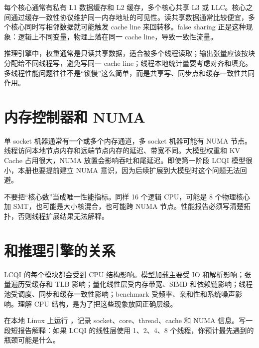 每个核心通常有私有 L1 数据缓存和 L2 缓存，多个核心共享 L3 或 LLC。核心之间通过缓存一致性协议维护同一内存地址的可见性。读共享数据通常比较便宜，多个核心同时写相邻数据就可能触发 cache line 来回转移。false sharing 正是这种现象：逻辑上不同变量，物理上落在同一 cache line，导致一致性流量。

推理引擎中，权重通常是只读共享数据，适合被多个线程读取；输出张量应该按块分配给不同线程写，避免写同一 cache line；线程本地统计量要考虑对齐和填充。多线程性能问题往往不是“锁慢”这么简单，而是共享写、同步点和缓存一致性共同作用。

\section{内存控制器和 NUMA}

单 socket 机器通常有一个或多个内存通道，多 socket 机器可能有 NUMA 节点。线程访问本地节点内存和远端节点内存的延迟、带宽不同。大模型权重和 KV Cache 占用很大，NUMA 放置会影响吞吐和尾延迟。即使第一阶段 LCQI 模型很小，本册也要提前建立 NUMA 意识，因为后续扩展到大模型时这个问题无法回避。

\begin{warningbox}
不要把“核心数”当成唯一性能指标。同样 16 个逻辑 CPU，可能是 8 个物理核心加 SMT，也可能是大小核混合，也可能跨 NUMA 节点。性能报告必须写清楚拓扑，否则线程扩展结果无法解释。
\end{warningbox}

\section{和推理引擎的关系}

LCQI 的每个模块都会受到 CPU 结构影响。模型加载主要受 IO 和解析影响；张量遍历受缓存和 TLB 影响；量化线性层受内存带宽、SIMD 和依赖链影响；线程池受调度、同步和缓存一致性影响；benchmark 受频率、亲和性和系统噪声影响。理解 CPU 结构，是为了把这些现象放回正确层级。

\begin{exercisebox}
在本地 Linux 上运行 ，记录 socket、core、thread、cache 和 NUMA 信息。写一段短报告解释：如果 LCQI 的线性层使用 1、2、4、8 个线程，你预计最先遇到的瓶颈可能是什么。
\end{exercisebox}
